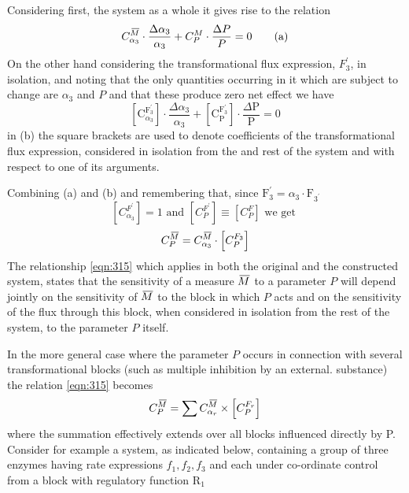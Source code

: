 Considering first, the system as a whole it gives rise to the relation
%
\begin{equation}
C_{\alpha_{3}}^{\,\overline{\!{M}}} \cdot \frac{\Delta \alpha_{3}}{\alpha_{3}} + C_{P}^{M} \cdot \frac{\Delta P}{P} = 0 \tag{a}
\label{eqn:315a}
\end{equation}
%
On the other hand considering the transformational flux expression, $F_{3}^{\prime}$, in isolation, and noting that the only quantities occurring in it which are subject to change are $\alpha_{3}$ and $P$ and that these produce zero net effect we have
%
\begin{equation}
\left[\mathrm{C}_{\alpha_{3}}^{\mathrm{F}_{3}^{\prime}}\right] \cdot \frac{\Delta \alpha_{3}}{\alpha_{3}} + \left[\mathrm{C}_{\mathrm{P}}^{\mathrm{F}^{\prime}_3}\right] \cdot \frac{\Delta \mathrm{P}}{\mathrm{P}}=0 \tag{b}
\label{eqn:315b}
\end{equation}
%
in (b) the square brackets are used to denote coefficients of the transformational flux expression, considered in isolation from the and rest of the system and with respect to one of its arguments.

Combining (a) and (b) and remembering that, since $\mathrm{F}_{3}^{\prime}=\alpha_{3} \cdot \mathrm{F}_{3^{\prime}}$
%
$$
\left[C^{F^{\prime}}_{\alpha_3}\right]=1 \text { and }\left[C_{P}^{F^{\prime}}\right] \equiv\left[C_{P}^{F}\right] \text { we get }
$$
%
\begin{equation}
C_{P}^{\,\overline{\!{M}}} = C_{\alpha_3}^{\,\overline{\!{M}}} \cdot\left[C_{P}^{F_{3}}\right]
\label{eqn:315}
\end{equation}
%
The relationship \eqref{eqn:315} which applies in both the original and the constructed system, states that the sensitivity of a measure $\,\overline{\!{M}}$ to a parameter $P$ will depend jointly on the sensitivity of $\,\overline{\!{M}}$ to the block in which $P$ acts and on the sensitivity of the flux through this block, when considered in isolation from the rest of the system, to the parameter $P$ itself.

In the more general case where the parameter $P$ occurs in connection with several transformational blocks (such as multiple inhibition by an external. substance) the relation \eqref{eqn:315} becomes
%
\begin{equation}
C_{P}^{\,\overline{\!{M}}}=\sum C_{\alpha_{r}}^{\,\overline{\!{M}}} \times \left[C_{P}^{F_r}\right]
\label{eqn:316}
\end{equation}
%
where the summation effectively extends over all blocks influenced directly by P. Consider for example a system, as indicated below, containing a group of three enzymes having rate expressions $f_{1}, f_{2}, f_{3}$ and each under co-ordinate control from a block with regulatory function $\mathrm{R_1}$

